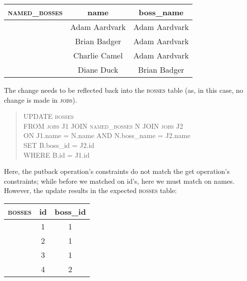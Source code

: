 \documentclass{article}
\begin{document}
\begin{center} \begin{tabular} {c | c c }
    \textsc{named\_bosses} & name & boss\_name \\
    \hline
    & Adam Aardvark & Adam Aardvark \\
    & Brian Badger & Adam Aardvark \\
    & Charlie Camel & Adam Aardvark \\
    & Diane Duck & Brian Badger
\end{tabular} \end{center}
The change needs to be reflected back into the \textsc{bosses}
table (as, in this case, no change is made in \textsc{jobs}).
\begin{quote}
    UPDATE \textsc{bosses} \\
    FROM \textsc{jobs} J1 JOIN \textsc{named\_bosses} N JOIN \textsc{jobs} J2 \\
    ON J1.name = N.name AND N.boss\_name = J2.name \\
    SET B.boss\_id = J2.id \\
    WHERE B.id = J1.id
\end{quote}
Here, the putback operation's constraints do not match
the get operation's constraints; while before we matched
on id's, here we must match on names. 
However, the update results in the expected \textsc{bosses} table:
\begin{center} \begin{tabular} {c | c c }
    \textsc{bosses} & id & boss\_id \\
    \hline
    & 1 & 1 \\
    & 2 & 1 \\
    & 3 & 1 \\
    & 4 & 2 
\end{tabular} \end{center}
\end{document}
